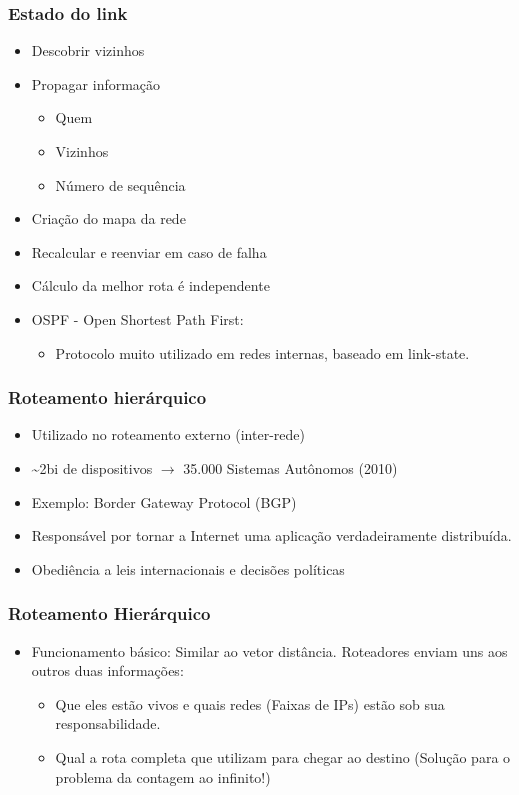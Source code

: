 \documentclass{beamer}
\begin{document}
\begin{frame}
\frametitle{Estado do link}

\begin{itemize}
  \item Descobrir vizinhos
  \item Propagar informação
  \begin{itemize}
     \item Quem
     \item Vizinhos
     \item Número de sequência
  \end{itemize}
  \item Criação do mapa da rede
  \item Recalcular e reenviar em caso de falha
  \item Cálculo da melhor rota é independente
  \item OSPF - Open Shortest Path First:
  \begin{itemize}
     \item Protocolo muito utilizado em redes internas,
        baseado em link-state.
  \end{itemize}
\end{itemize}
\end{frame}

\begin{frame}
\frametitle{Roteamento hierárquico}
\begin{itemize}
  \setlength{\itemsep}{0.7cm}%
  \item Utilizado no roteamento externo (inter-rede)
  \item \textasciitilde2bi de dispositivos $\to$ 35.000 Sistemas Autônomos
  (2010)
  \item Exemplo: Border Gateway Protocol (BGP)
  \item Responsável por tornar a Internet uma aplicação verdadeiramente distribuída.
  \item Obediência a leis internacionais e decisões políticas
\end{itemize}
\end{frame}

\begin{frame}
\frametitle{Roteamento Hierárquico}
\begin{itemize}
  \item Funcionamento básico: Similar ao vetor distância. Roteadores enviam uns
  aos outros duas informações:
  \begin{itemize}
    \item Que eles estão vivos e quais redes (Faixas de IPs) estão sob sua
    responsabilidade.
    \item Qual a rota completa que utilizam para chegar ao destino (Solução para
    o problema da contagem ao infinito!)
  \end{itemize}
\end{itemize}
\end{frame}
\end{document}
